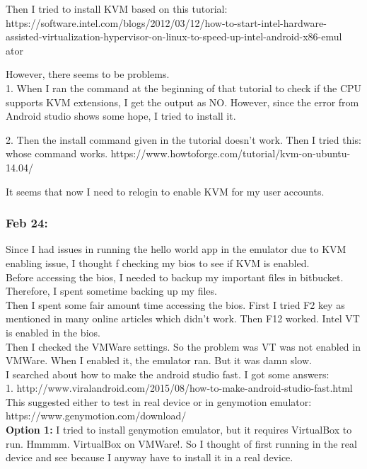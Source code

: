 \documentclass[11pt]{article}
\begin{document}
Then I tried to install KVM based on this tutorial:\\
https://software.intel.com/blogs/2012/03/12/how-to-start-intel-hardware-assisted-virtualization-hypervisor-on-linux-to-speed-up-intel-android-x86-emul
ator

However, there seems to be problems. \\
1. When I ran the command at the beginning of that tutorial to check if the CPU supports KVM extensions, I get 
the output as NO. However, since the error from Android studio shows some hope, I tried to install it.

2. Then the install command given in the tutorial doesn't work. Then I tried this: whose command works. 
https://www.howtoforge.com/tutorial/kvm-on-ubuntu-14.04/

It seems that now I need to relogin to enable KVM for my user accounts. 

\subsubsection*{Feb 24:}
Since I had issues in running the hello world app in the emulator due to KVM enabling issue, I thought f checking my bios to see if KVM is enabled.\\
Before accessing the bios, I needed to backup my important files in bitbucket. Therefore, I spent sometime backing up my files.\\
Then I spent some fair amount time accessing the bios. First I tried F2 key as mentioned in many online articles which didn't work. Then F12 worked. 
Intel VT is enabled in the bios.\\
Then I checked the VMWare settings. So the problem was VT was not enabled in VMWare. When I enabled it, the emulator ran. But it was damn slow.\\

I searched about how to make the android studio fast. I got some answers:\\
1. http://www.viralandroid.com/2015/08/how-to-make-android-studio-fast.html\\
This suggested either to test in real device or in genymotion emulator: https://www.genymotion.com/download/\\

\textbf{Option 1: } I tried to install genymotion emulator, but it requires VirtualBox to run. Hmmmm. VirtualBox on VMWare!. So I thought of 
first running in the real device and see because I anyway have to install it in a real device.
\end{document}
